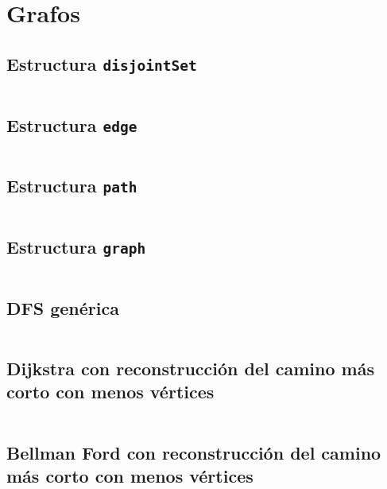 \documentclass[11pt]{article}
\begin{document}
	\newpage
	\section{Grafos}
		\subsection{Estructura \texttt{disjointSet}}
		\inputminted[tabsize=2,breaklines,firstline=8,lastline=37,fontsize=\small]{c++}{graph.cpp}
		
		\subsection{Estructura \texttt{edge}}
		\inputminted[tabsize=2,breaklines,firstline=39,lastline=57,fontsize=\small]{c++}{graph.cpp}
		
		\subsection{Estructura \texttt{path}}
		\inputminted[tabsize=2,breaklines,firstline=59,lastline=64,fontsize=\small]{c++}{graph.cpp}
		
		\subsection{Estructura \texttt{graph}}
		\inputminted[tabsize=2,breaklines,firstline=66,lastline=101,fontsize=\small]{c++}{graph.cpp}
		
		\subsection{DFS genérica}
		\inputminted[tabsize=2,breaklines,firstline=411,lastline=429,fontsize=\small]{c++}{graph.cpp}
		
		\subsection{Dijkstra con reconstrucción del camino más corto con menos vértices}
		\inputminted[tabsize=2,breaklines,firstline=103,lastline=129,fontsize=\small]{c++}{graph.cpp}
		
		\subsection{Bellman Ford con reconstrucción del camino más corto con menos vértices}
		\inputminted[tabsize=2,breaklines,firstline=131,lastline=165,fontsize=\small]{c++}{graph.cpp}
		
\end{document}
